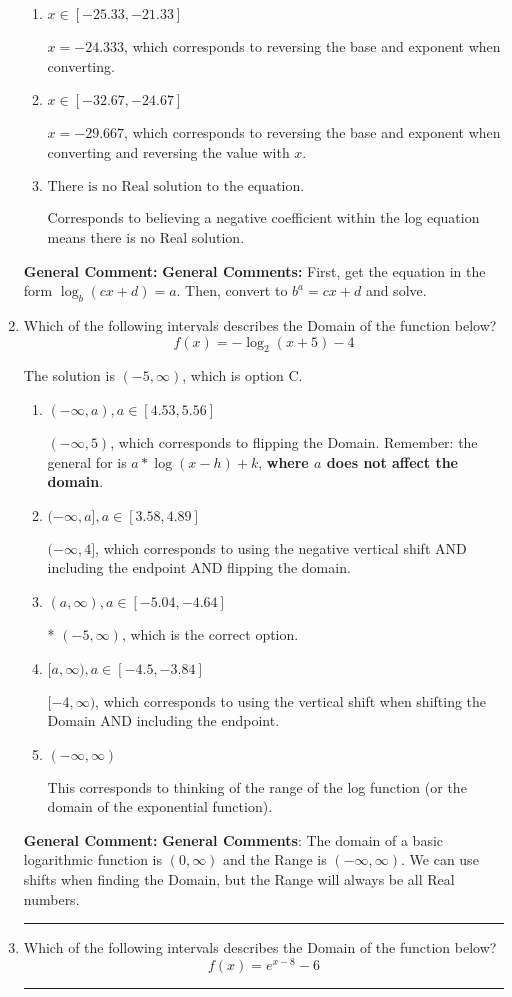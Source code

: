 \documentclass{extbook}[14pt]
\newcommand{\litem}[1]{\item #1

\rule{\textwidth}{0.4pt}}
\begin{document}
\begin{enumerate}
{\begin{enumerate}[label=\Alph*.]
* $x = 2.661$, which is the correct option.
\item \( x \in [-25.33, -21.33] \)

$x = -24.333$, which corresponds to reversing the base and exponent when converting.
\item \( x \in [-32.67, -24.67] \)

$x = -29.667$, which corresponds to reversing the base and exponent when converting and reversing the value with $x$.
\item \( \text{There is no Real solution to the equation.} \)

Corresponds to believing a negative coefficient within the log equation means there is no Real solution.
\end{enumerate}

\textbf{General Comment:} \textbf{General Comments:} First, get the equation in the form $\log_b{(cx+d)} = a$. Then, convert to $b^a = cx+d$ and solve.
}
\litem{
Which of the following intervals describes the Domain of the function below?
\[ f(x) = -\log_2{(x+5)}-4 \]

The solution is \( (-5, \infty) \), which is option C.\begin{enumerate}[label=\Alph*.]
\item \( (-\infty, a), a \in [4.53, 5.56] \)

$(-\infty, 5)$, which corresponds to flipping the Domain. Remember: the general for is $a*\log(x-h)+k$, \textbf{where $a$ does not affect the domain}.
\item \( (-\infty, a], a \in [3.58, 4.89] \)

$(-\infty, 4]$, which corresponds to using the negative vertical shift AND including the endpoint AND flipping the domain.
\item \( (a, \infty), a \in [-5.04, -4.64] \)

* $(-5, \infty)$, which is the correct option.
\item \( [a, \infty), a \in [-4.5, -3.84] \)

$[-4, \infty)$, which corresponds to using the vertical shift when shifting the Domain AND including the endpoint.
\item \( (-\infty, \infty) \)

This corresponds to thinking of the range of the log function (or the domain of the exponential function).
\end{enumerate}

\textbf{General Comment:} \textbf{General Comments}: The domain of a basic logarithmic function is $(0, \infty)$ and the Range is $(-\infty, \infty)$. We can use shifts when finding the Domain, but the Range will always be all Real numbers.
}
\litem{
Which of the following intervals describes the Domain of the function below?
\[ f(x) = e^{x-8}-6 \]

}
\end{enumerate}
\end{document}
